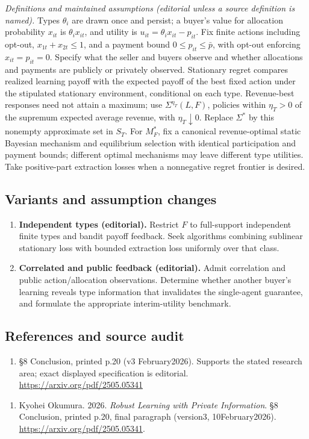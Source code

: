\documentclass[11pt,a4paper]{article}
\begin{document}
\emph{Definitions and maintained assumptions (editorial unless a source definition is named).} Types \(\theta_i\) are drawn once and persist; a buyer’s value for allocation probability \(x_{it}\) is \(\theta_i x_{it}\), and utility is \(u_{it}=\theta_i x_{it}-p_{it}\). Fix finite actions including opt-out, \(x_{1t}+x_{2t}\le1\), and a payment bound \(0\le p_{it}\le\bar p\), with opt-out enforcing \(x_{it}=p_{it}=0\). Specify what the seller and buyers observe and whether allocations and payments are publicly or privately observed. Stationary regret compares realized learning payoff with the expected payoff of the best fixed action under the stipulated stationary environment, conditional on each type. Revenue-best responses need not attain a maximum; use \(\Sigma^{\eta_T}(L,F)\), policies within \(\eta_T>0\) of the supremum expected average revenue, with \(\eta_T\downarrow0\). Replace \(\Sigma^*\) by this nonempty approximate set in \(S_T\). For \(M_F^*\), fix a canonical revenue-optimal static Bayesian mechanism and equilibrium selection with identical participation and payment bounds; different optimal mechanisms may leave different type utilities. Take positive-part extraction losses when a nonnegative regret frontier is desired.
\subsection*{Variants and assumption changes}
\begin{enumerate}
\item \textbf{Independent types (editorial).} Restrict \(F\) to full-support independent finite types and bandit payoff feedback. Seek algorithms combining sublinear stationary loss with bounded extraction loss uniformly over that class.
\item \textbf{Correlated and public feedback (editorial).} Admit correlation and public action/allocation observations. Determine whether another buyer’s learning reveals type information that invalidates the single-agent guarantee, and formulate the appropriate interim-utility benchmark.
\end{enumerate}
\subsection*{References and source audit}
\begin{enumerate}
\item §8 Conclusion, printed p.20 (v3 February2026). Supports the stated research area; exact displayed specification is editorial. \url{https://arxiv.org/pdf/2505.05341}
\end{enumerate}
\begin{enumerate}\raggedright
\item\hypertarget{definitions:source:30007569:1}{} Kyohei Okumura. 2026. \emph{Robust Learning with Private Information}. §8 Conclusion, printed p.20, final paragraph (version3, 10February2026).
\url{https://arxiv.org/pdf/2505.05341}.
\end{enumerate}
\end{document}
